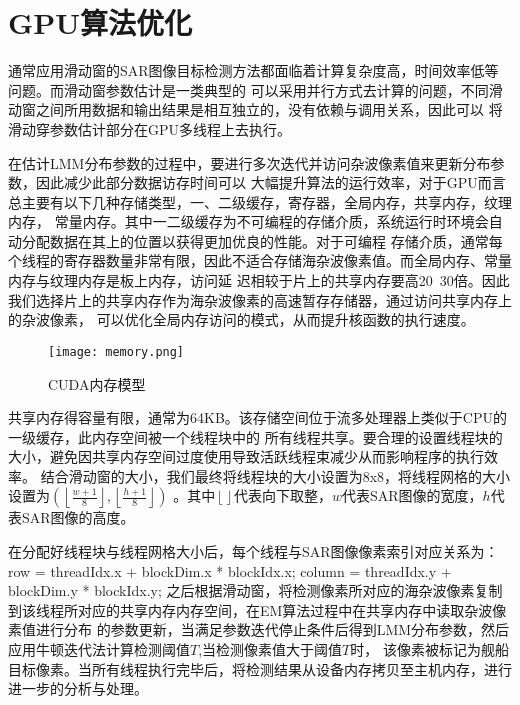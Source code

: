 \section{GPU算法优化}
    通常应用滑动窗的SAR图像目标检测方法都面临着计算复杂度高，时间效率低等问题。而滑动窗参数估计是一类典型的
    可以采用并行方式去计算的问题，不同滑动窗之间所用数据和输出结果是相互独立的，没有依赖与调用关系，因此可以
    将滑动穿参数估计部分在GPU多线程上去执行。

    在估计LMM分布参数的过程中，要进行多次迭代并访问杂波像素值来更新分布参数，因此减少此部分数据访存时间可以
    大幅提升算法的运行效率，对于GPU而言总主要有以下几种存储类型，一、二级缓存，寄存器，全局内存，共享内存，纹理内存，
    常量内存。其中一二级缓存为不可编程的存储介质，系统运行时环境会自动分配数据在其上的位置以获得更加优良的性能。对于可编程
    存储介质，通常每个线程的寄存器数量非常有限，因此不适合存储海杂波像素值。而全局内存、常量内存与纹理内存是板上内存，访问延
    迟相较于片上的共享内存要高20~30倍。因此我们选择片上的共享内存作为海杂波像素的高速暂存存储器，通过访问共享内存上的杂波像素，
    可以优化全局内存访问的模式，从而提升核函数的执行速度。

     \begin{figure}[H] %
      \centering
      \texttt{[image: memory.png]}
      \caption{CUDA内存模型}
      \label{fig:chap2:slide}
    \end{figure}   

    共享内存得容量有限，通常为64KB。该存储空间位于流多处理器上类似于CPU的一级缓存，此内存空间被一个线程块中的
    所有线程共享。要合理的设置线程块的大小，避免因共享内存空间过度使用导致活跃线程束减少从而影响程序的执行效率。
    结合滑动窗的大小，我们最终将线程块的大小设置为8x8，将线程网格的大小设置为$(\left\lfloor {\frac{{w + 1}}{8}} \right\rfloor ,\left\lfloor {\frac{{h + 1}}{8}} \right\rfloor )$
    。其中$\left\lfloor {} \right\rfloor $代表向下取整，$w$代表SAR图像的宽度，$h$代表SAR图像的高度。
    
    在分配好线程块与线程网格大小后，每个线程与SAR图像像素索引对应关系为：row = threadIdx.x + blockDim.x * blockIdx.x; column = threadIdx.y + blockDim.y * blockIdx.y;
    之后根据滑动窗，将检测像素所对应的海杂波像素复制到该线程所对应的共享内存内存空间，在EM算法过程中在共享内存中读取杂波像素值进行分布
    的参数更新，当满足参数迭代停止条件后得到LMM分布参数，然后应用牛顿迭代法计算检测阈值$T$,当检测像素值大于阈值$T$时，
    该像素被标记为舰船目标像素。当所有线程执行完毕后，将检测结果从设备内存拷贝至主机内存，进行进一步的分析与处理。

